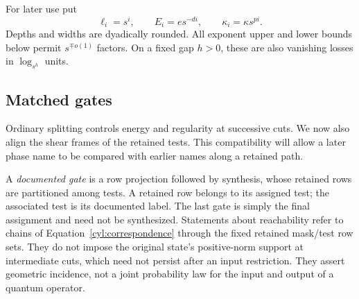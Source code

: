For later use put
\begin{equation}\label{cyl:benchmarks}
 \ell_i=s^i,\qquad E_i=e s^{-di},\qquad\kappa_i=\kappa s^{pi}.
\end{equation}
Depths and widths are dyadically rounded.  All exponent upper and lower
bounds below permit $s^{\mp o(1)}$ factors.  On a fixed gap $h>0$, these
are also vanishing losses in $\log_{s^h}$ units.

\subsection{Matched gates}

Ordinary splitting controls energy and regularity at successive cuts.
We now also align the shear frames of the retained tests. This compatibility
will allow a later phase name to be compared with earlier names along a
retained path.

A \emph{documented gate} is a row projection followed by synthesis,
whose retained rows are partitioned among tests.  A retained row belongs
to its assigned test; the associated test is its documented label.
The last gate is simply the final assignment and need not be synthesized.
Statements about reachability refer to chains of
Equation~\eqref{cyl:correspondence} through the fixed retained
mask/test row sets. They do not impose the original state's
positive-norm support at intermediate cuts, which need not persist
after an input restriction. They assert geometric incidence, not a
joint probability law for the input and output of a quantum operator.

